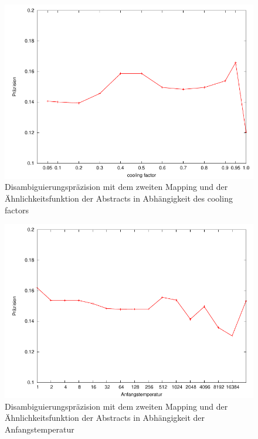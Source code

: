 \begin{figure}[tbh]
\includegraphics[height=0.4\textheight]{img/pdf/mapping2/cooling_factor.pdf}
\caption[]{Disambiguierungspräzision mit dem zweiten Mapping und der Ähnlichkeitsfunktion der Abstracts in Abhängigkeit des cooling factors}
\label{fig:disambiguierung_evaluierung_mapping2_cooling_factor}
\end{figure}

\begin{figure}[tbh]
\includegraphics[height=0.4\textheight]{img/pdf/mapping2/starting_temperature.pdf}
\caption[]{Disambiguierungspräzision mit dem zweiten Mapping und der Ähnlichkeitsfunktion der Abstracts in Abhängigkeit der Anfangstemperatur}
\label{fig:disambiguierung_evaluierung_mapping2_starting_temperature}
\end{figure}

